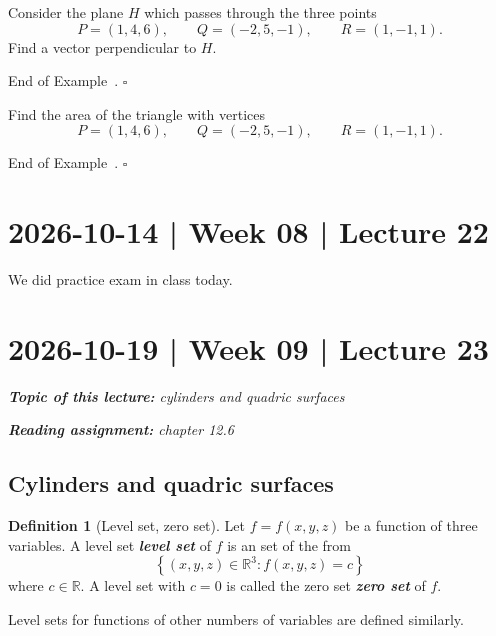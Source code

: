 \documentclass[10pt]{article}
\DeclareRobustCommand{\demph}[1]{%
  \ifmmode
  {\color{Blue}#1}%
  \else
  {\color{Blue}\bfseries\slshape #1}%
  \fi
}
\theoremstyle{definition}
\newtheorem{definition}[theorem]{Definition}
\newtheorem{example}[theorem]{Example}
\renewenvironment{example}
{\begin{oldexample}}
  {\par\smallskip\hfill   End of Example~\theexample. $\square$    \par\end{oldexample}}
\newcommand{\1}[1]{\textbf{1}_{\left[#1\right]}} %
\def\R{\mathbb{R}} %
\begin{document}
\begin{example}
  Consider the plane $H$ which passes through the three points
  \begin{equation*}
    P=(1,4,6), \qquad Q = (-2,5,-1), \qquad R = (1,-1,1).
  \end{equation*}
  Find a vector perpendicular to $H$.
\end{example}


\begin{example}
  Find the area of the triangle with vertices
  \begin{equation*}
    P = (1,4,6), \qquad  Q = (-2,5,-1), \qquad  R= (1,-1,1).
  \end{equation*}
\end{example}


\newpage
\section{2026-10-14 | Week 08 | Lecture 22}

We did practice exam in class today.


\newpage

\section{2026-10-19 | Week 09 | Lecture 23}
\begin{center}
  \begin{tcolorbox}[width=0.9\textwidth, colback=white, colframe=black]
    \textit{\textbf{Topic of this lecture:} cylinders and quadric surfaces}

    \textit{\textbf{Reading assignment:} chapter 12.6}
  \end{tcolorbox}
\end{center}

\subsection{Cylinders and quadric surfaces}
\begin{definition}[Level set, zero set]
  \label{def:level-set-zero-set}
  Let $f=f(x,y,z)$ be a function of three variables. A \demph{level set} of $f$
  is an set of the from
  \begin{equation}\label{eq:level-set}
    \left\{(x,y,z)\in \R^{3} : f(x,y,z)=c\right\}
  \end{equation}
  where $c\in \R$. A level set with $c=0$ is called the \demph{zero set} of
  $f$.

  Level sets for functions of other numbers of variables are defined similarly.
\end{definition}
\end{document}
